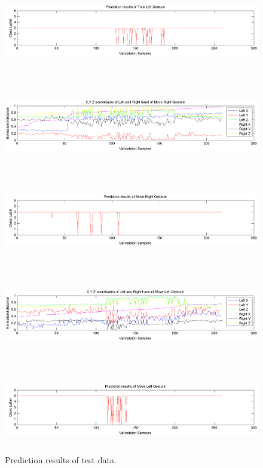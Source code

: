 \begin{figure}
	[h] \hspace{-15 mm} 
	\includegraphics[height=37mm]{figures/result/test-prediction-turn-left.png} 
\end{figure}
\begin{figure}
	[h] \hspace{-15 mm} 
	\includegraphics[height=37mm]{figures/result/test-axis-move-right.png} 
\end{figure}
\begin{figure}
	[h] \hspace{-15 mm} 
	\includegraphics[height=37mm]{figures/result/test-prediction-move-right.png} 
\end{figure}
\begin{figure}
	[h] \hspace{-15 mm} 
	\includegraphics[height=37mm]{figures/result/test-axis-move-left.png} 
\end{figure}
\begin{figure}
	[h] \hspace{-15 mm} 
	\includegraphics[height=37mm]{figures/result/test-prediction-move-left.png} 
	\caption{Prediction results of test data.}
	\label{ev:test:prediction}
\end{figure}
